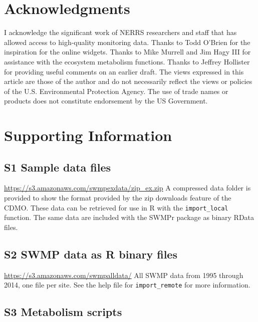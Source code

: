 \documentclass[10pt,letterpaper]{article}\usepackage[]{graphicx}\usepackage[]{color}
\begin{document}
\section*{Acknowledgments}

I acknowledge the significant work of \gls{NERRS} researchers and staff that has allowed access to high-quality monitoring data.  Thanks to Todd O'Brien for the inspiration for the online widgets. Thanks to Mike Murrell and Jim Hagy III for assistance with the ecosystem metabolism functions. Thanks to Jeffrey Hollister for providing useful comments on an earlier draft.  The views expressed in this article are those of the author and do not necessarily reflect the views or policies of the U.S. Environmental Protection Agency.  The use of trade names or products does not constitute endorsement by the US Government.   

\nolinenumbers



\section*{Supporting Information}
\label{supp_info}

\subsection*{S1 Sample data files}
\label{supp_zip}

\href{https://s3.amazonaws.com/swmpexdata/zip_ex.zip}{https://s3.amazonaws.com/swmpexdata/zip\_ex.zip} A compressed data folder is provided to show the format provided by the zip downloads feature of the \gls{CDMO}.  These data can be retrieved for use in R with the \texttt{import\_local} function.  The same data are included with the SWMPr package as binary RData files. 

\subsection*{S2 \gls{SWMP} data as R binary files}

\href{https://s3.amazonaws.com/swmpalldata/}{https://s3.amazonaws.com/swmpalldata/} All \gls{SWMP} data from 1995 through 2014, one file per site. See the help file for \texttt{import\_remote} for more information.

\subsection*{S3 Metabolism scripts}
\label{met_scripts}
\end{document}
